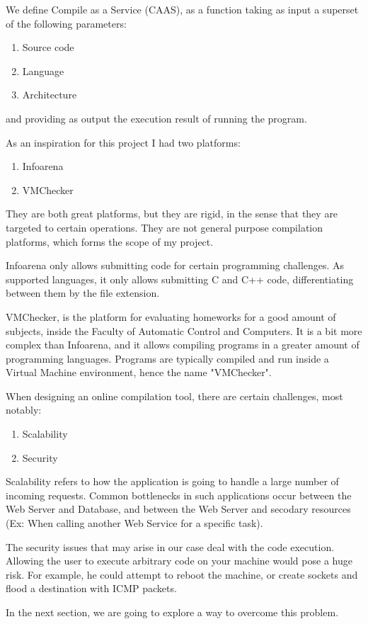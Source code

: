
We define Compile as a Service (CAAS), as a function taking as input a superset of the following parameters:
\begin{enumerate}
\item{Source code}
\item{Language}
\item{Architecture}
\end{enumerate}
and providing as output the execution result of running the program.


As an inspiration for this project I had two platforms: 
\begin{enumerate}
\item{Infoarena}
\item{VMChecker}
\end{enumerate}

They are both great platforms, but they are rigid, in the sense that they are targeted to certain operations.
They are not general purpose compilation platforms, which forms the scope of my project.

Infoarena only allows submitting code for certain programming challenges.
As supported languages, it only allows submitting C and C++ code, differentiating between them by the file extension.

VMChecker, is the platform for evaluating homeworks for a good amount of subjects, inside the Faculty of Automatic Control and Computers.
It is a bit more complex than Infoarena, and it allows compiling programs in a greater amount of programming languages.
Programs are typically compiled and run inside a Virtual Machine environment, hence the name "VMChecker".


When designing an online compilation tool, there are certain challenges, most notably:
\begin{enumerate}
\item{Scalability}
\item{Security}
\end{enumerate}

Scalability refers to how the application is going to handle a large number of incoming requests.
Common bottlenecks in such applications occur between the Web Server and Database, and between the Web Server and secodary resources (Ex: When calling another Web Service for a specific task).

The security issues that may arise in our case deal with the code execution.
Allowing the user to execute arbitrary code on your machine would pose a huge risk.
For example, he could attempt to reboot the machine, or create sockets and flood a destination with ICMP packets.

In the next section, we are going to explore a way to overcome this problem.










 
